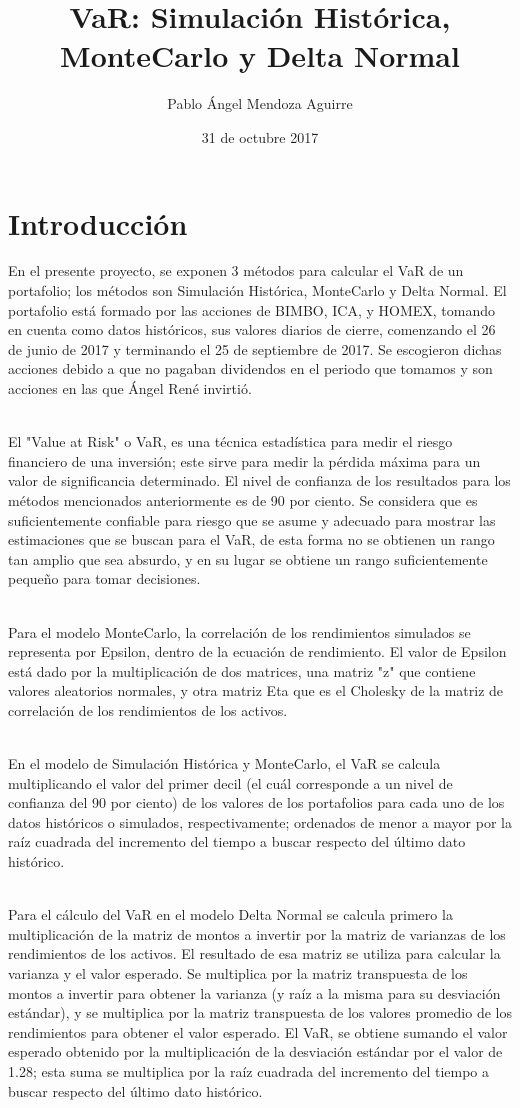 \documentclass[12pt]{article}
\title{VaR: Simulación Histórica, MonteCarlo y Delta Normal}
\author{Pablo Ángel Mendoza Aguirre}
\date{31 de octubre 2017}
\begin{document}
\maketitle
\section{Introducción}

En el presente proyecto, se exponen 3 métodos para calcular el VaR de un portafolio; los métodos son Simulación Histórica, MonteCarlo y Delta Normal. El portafolio está formado por las acciones de BIMBO, ICA, y HOMEX, tomando en cuenta como datos históricos, sus valores diarios de cierre, comenzando el 26 de junio de 2017 y terminando el 25 de septiembre de 2017. Se escogieron dichas acciones debido a que no pagaban dividendos en el periodo que tomamos y son acciones en las que Ángel René invirtió.

\ \\%
El "Value at Risk" o VaR, es una técnica estadística para medir el riesgo financiero de una inversión; este sirve para medir la pérdida máxima para un valor de significancia determinado. El nivel de confianza de los resultados para los métodos mencionados anteriormente es de 90 por ciento. Se considera que es suficientemente confiable para riesgo que se asume y adecuado para mostrar las estimaciones que se buscan para el VaR, de esta forma no se obtienen un rango tan amplio que sea absurdo, y en su lugar se obtiene un rango suficientemente pequeño para tomar decisiones.

\ \\%
Para el modelo MonteCarlo, la correlación de los rendimientos simulados se representa por Epsilon, dentro de la ecuación de rendimiento. El valor de Epsilon está dado por la multiplicación de dos matrices, una matriz "z" que contiene valores aleatorios normales, y otra matriz Eta que es el Cholesky de la matriz de correlación de los rendimientos de los activos. 

\ \\%
En el modelo de Simulación Histórica y MonteCarlo, el VaR se calcula multiplicando el valor del primer decil (el cuál corresponde a un nivel de confianza del 90 por ciento) de los valores de los portafolios para cada uno de los datos históricos o simulados, respectivamente; ordenados de menor a mayor por la raíz cuadrada del incremento del tiempo a buscar respecto del último dato histórico.

\ \\%
Para el cálculo del VaR en el modelo Delta Normal se calcula primero la multiplicación de la matriz de montos a invertir por la matriz de varianzas de los rendimientos de los activos. 
El resultado de esa matriz se utiliza para calcular la varianza y el valor esperado.
Se multiplica por la matriz transpuesta de los montos a invertir para obtener la varianza (y raíz a la misma para su desviación estándar), y se multiplica por la matriz transpuesta de los valores promedio de los rendimientos para obtener el valor esperado. El VaR, se obtiene sumando el valor esperado obtenido por la multiplicación de la desviación estándar por el valor de 1.28; esta suma se multiplica por la raíz cuadrada del incremento del tiempo a buscar respecto del último dato histórico.
\end{document}
